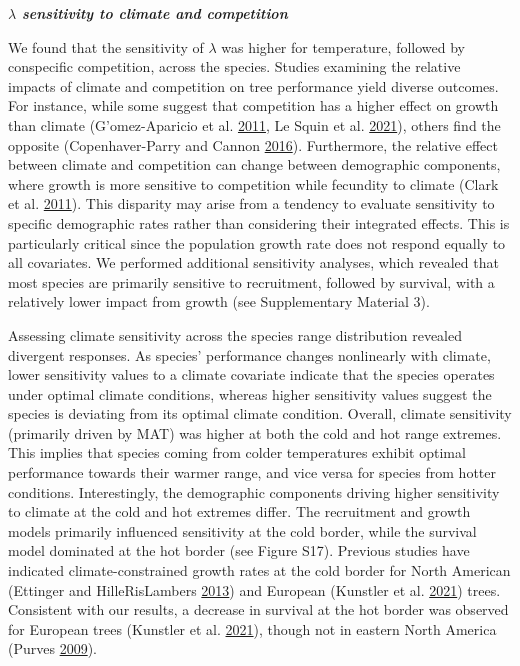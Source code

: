 \documentclass[12pt]{article}
\begin{document}
\textbf{\emph{\(\lambda\) sensitivity to climate and competition}}

We found that the sensitivity of \(\lambda\) was higher for temperature,
followed by conspecific competition, across the species. Studies
examining the relative impacts of climate and competition on tree
performance yield diverse outcomes. For instance, while some suggest
that competition has a higher effect on growth than climate
(G\a'omez-Aparicio et al.
\protect\hyperlink{ref-GomezAparicio2011}{2011}, Le Squin et al.
\protect\hyperlink{ref-LeSquin2021}{2021}), others find the opposite
(Copenhaver-Parry and Cannon
\protect\hyperlink{ref-CopenhaverParry2016}{2016}). Furthermore, the
relative effect between climate and competition can change between
demographic components, where growth is more sensitive to competition
while fecundity to climate (Clark et al.
\protect\hyperlink{ref-Clark2011}{2011}). This disparity may arise from
a tendency to evaluate sensitivity to specific demographic rates rather
than considering their integrated effects. This is particularly critical
since the population growth rate does not respond equally to all
covariates. We performed additional sensitivity analyses, which revealed
that most species are primarily sensitive to recruitment, followed by
survival, with a relatively lower impact from growth (see Supplementary
Material 3).

Assessing climate sensitivity across the species range distribution
revealed divergent responses. As species' performance changes
nonlinearly with climate, lower sensitivity values to a climate
covariate indicate that the species operates under optimal climate
conditions, whereas higher sensitivity values suggest the species is
deviating from its optimal climate condition. Overall, climate
sensitivity (primarily driven by MAT) was higher at both the cold and
hot range extremes. This implies that species coming from colder
temperatures exhibit optimal performance towards their warmer range, and
vice versa for species from hotter conditions. Interestingly, the
demographic components driving higher sensitivity to climate at the cold
and hot extremes differ. The recruitment and growth models primarily
influenced sensitivity at the cold border, while the survival model
dominated at the hot border (see Figure S17). Previous studies have
indicated climate-constrained growth rates at the cold border for North
American (Ettinger and HilleRisLambers
\protect\hyperlink{ref-Ettinger2013}{2013}) and European (Kunstler et
al. \protect\hyperlink{ref-Kunstler2021}{2021}) trees. Consistent with
our results, a decrease in survival at the hot border was observed for
European trees (Kunstler et al.
\protect\hyperlink{ref-Kunstler2021}{2021}), though not in eastern North
America (Purves \protect\hyperlink{ref-Purves2009}{2009}).
\end{document}
